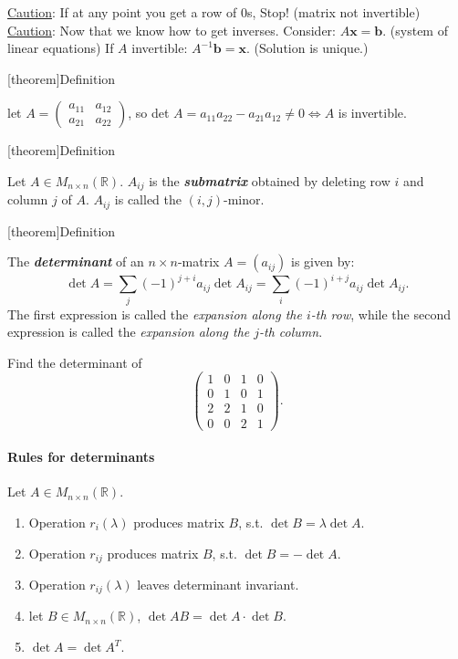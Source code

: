 \documentclass[12pt]{report}
\theoremstyle{definition}
\begin{document}
\underline{Caution}: If at any point you get a row of 0s, Stop! (matrix not invertible)
\underline{Caution}: Now that we know how to get inverses. Consider:
$A\pmb{x} = \pmb{b}$. (system of linear equations)
If $A$ invertible: $A^{-1}\pmb{b} = \pmb{x}$. (Solution is unique.)

[theorem]{Definition}
\begin{determinant}
    let $A = \begin{pmatrix}
        a_{11} & a_{12} \\
        a_{21} & a_{22}
    \end{pmatrix} $,
    so det $A = a_{11}a_{22} - a_{21}a_{12}\neq 0 \iff A$ is invertible.
\end{determinant}

[theorem]{Definition}
\begin{submatrix}
    Let $A \in M_{n\times n} (\mathbb{R})$. $A_{ij}$ is the \textbf{\emph{submatrix}} obtained
    by deleting row $i$ and column $j$ of $A$. $A_{ij}$ is called the $(i,j)$-minor.
\end{submatrix}

[theorem]{Definition}
\begin{determinant of nxn matrix}
    The \textbf{\emph{determinant}} of an $n\times n$-matrix $A = (a_{ij})$ is given by:\[
        \det{A} = \sum_{j}^{} {(-1)}^{j + i} a_{ij} \det{A_{ij}}
        = \sum_{i}^{} {(-1)}^{i + j} a_{ij} \det{A_{ij}}.
    \]
    The first expression is called the \emph{expansion along the $i$-th row},
    while the second expression is called the \emph{expansion along the $j$-th column}.
\end{determinant of nxn matrix}

\begin{ex}
    Find the determinant of\[
        \begin{pmatrix}
            1 & 0 & 1 & 0 \\
            0 & 1 & 0 & 1 \\
            2 & 2 & 1 & 0 \\
            0 & 0 & 2 & 1
        \end{pmatrix}.
    \]
\end{ex}

\paragraph{Rules for determinants}
Let $A \in M_{n\times n}(\mathbb{R})$.
\begin{enumerate}[label = (\arabic*)]
    \item Operation $r_i(\lambda)$ produces matrix $B$, s.t. $\det{B} = \lambda \det{A}$.
    \item Operation $r_{ij}$ produces matrix $B$, s.t. $\det{B} = - \det{A}$.
    \item Operation $r_{ij}(\lambda)$ leaves determinant invariant.
    \item let $B \in M_{n\times n}(\mathbb{R})$, $\det{AB} = \det{A} \cdot \det{B}$.
    \item $\det{A} = \det{A^{T}}$.
\end{enumerate}
\end{document}
